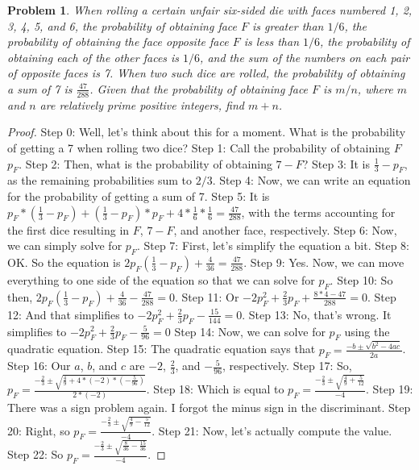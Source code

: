 \documentclass{article}
\newtheorem{theorem}{Problem}
\begin{document}
\begin{theorem}
When rolling a certain unfair six-sided die with faces numbered 1, 2, 3, 4, 5, and 6, the probability of obtaining face $F$ is greater than $1/6$, the probability of obtaining the face opposite face $F$ is less than $1/6$, the probability of obtaining each of the other faces is $1/6$, and the sum of the numbers on each pair of opposite faces is 7. When two such dice are rolled, the probability of obtaining a sum of 7 is $ \frac{47}{288} $. Given that the probability of obtaining face $F$ is $m/n$, where $m$ and $n$ are relatively prime positive integers, find $m+n$.
\end{theorem}

\begin{proof}
Step 0: Well, let's think about this for a moment. What is the probability of getting a 7 when rolling two dice?
Step 1: Call the probability of obtaining $F$ $p_F$.
Step 2: Then, what is the probability of obtaining $7-F$?
Step 3: It is $\frac{1}{3}-p_F$, as the remaining probabilities sum to $2/3$.
Step 4: Now, we can write an equation for the probability of getting a sum of 7.
Step 5: It is $p_F*(\frac{1}{3}-p_F)+(\frac{1}{3}-p_F)*p_F+4*\frac{1}{6}*\frac{1}{6}=\frac{47}{288}$, with the terms accounting for the first dice resulting in $F$, $7-F$, and another face, respectively.
Step 6: Now, we can simply solve for $p_F$.
Step 7: First, let's simplify the equation a bit.
Step 8: OK. So the equation is $2p_F(\frac{1}{3}-p_F)+\frac{4}{36}=\frac{47}{288}$.
Step 9: Yes. Now, we can move everything to one side of the equation so that we can solve for $p_F$.
Step 10: So then, $2p_F(\frac{1}{3}-p_F)+\frac{4}{36}-\frac{47}{288}=0$.
Step 11: Or $-2p_F^2+\frac{2}{3}p_F+\frac{8*4-47}{288}=0$.
Step 12: And that simplifies to $-2p_F^2+\frac{2}{3}p_F-\frac{15}{144}=0$.
Step 13: No, that's wrong. It simplifies to $-2p_F^2+\frac{2}{3}p_F-\frac{5}{96}=0$
Step 14: Now, we can solve for $p_F$ using the quadratic equation.
Step 15: The quadratic equation says that $p_F=\frac{-b\pm\sqrt{b^2-4ac}}{2a}$.
Step 16: Our $a$, $b$, and $c$ are $-2$, $\frac{2}{3}$, and $-\frac{5}{96}$, respectively.
Step 17: So, $p_F=\frac{-\frac{2}{3}\pm\sqrt{\frac{4}{9}+4*(-2)*(-\frac{5}{96})}}{2*(-2)}$.
Step 18: Which is equal to $p_F=\frac{-\frac{2}{3}\pm\sqrt{\frac{4}{9}+\frac{5}{12}}}{-4}$.
Step 19: There was a sign problem again. I forgot the minus sign in the discriminant.
Step 20: Right, so $p_F=\frac{-\frac{2}{3}\pm\sqrt{\frac{4}{9}-\frac{5}{12}}}{-4}$.
Step 21: Now, let's actually compute the value.
Step 22: So $p_F=\frac{-\frac{2}{3}\pm\sqrt{\frac{8}{36}-\frac{15}{36}}}{-4}$.

\end{proof}
\end{document}
